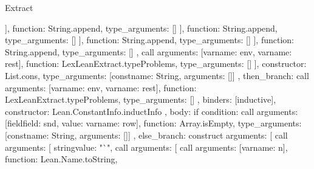 \begin{lexlean}{Extract}
\begin{toolingmodule}
{{{{{{{{{{{{{{{                                              ],
                                              function: String.append,
                                              type_arguments: []
                                            }
                                          ],
                                          function: String.append,
                                          type_arguments: []
                                        }
                                      ],
                                      function: String.append,
                                      type_arguments: []
                                    }
                                  ],
                                  function: String.append,
                                  type_arguments: []
                                },
                                call{
                                  arguments: [var{name: env}, var{name: rest}],
                                  function: LexLeanExtract.typeProblems,
                                  type_arguments: []
                                }
                              ],
                              constructor: List.cons,
                              type_arguments: [const{name: String, arguments: []}]
                            },
                            then_branch: call{
                              arguments: [var{name: env}, var{name: rest}],
                              function: LexLeanExtract.typeProblems,
                              type_arguments: []
                            }
                          },
                          binders: [inductive],
                          constructor: Lean.ConstantInfo.inductInfo
                        },
                        {
                          body: if{
                            condition: call{
                              arguments: [field{field: snd, value: var{name: row}}],
                              function: Array.isEmpty,
                              type_arguments: [const{name: String, arguments: []}]
                            },
                            else_branch: construct{
                              arguments: [
                                call{
                                  arguments: [
                                    string{value: "`"},
                                    call{
                                      arguments: [
                                        call{
                                          arguments: [var{name: n}],
                                          function: Lean.Name.toString,
}}}}}}}}}}}}}}
\end{toolingmodule}
\end{lexlean}

